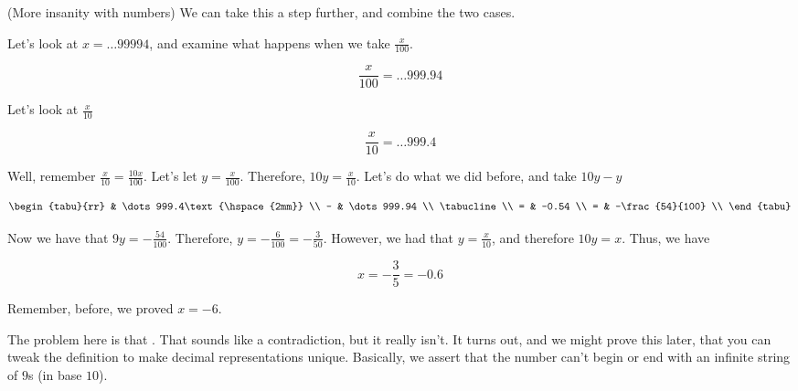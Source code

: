 \begin{example}(More insanity with numbers)
  We can take this a step further, and combine the two cases.

  Let's look at $x = \dots99994$, and examine what happens when we
  take $\frac{x}{100}$.

  \begin{displaymath}
    \frac{x}{100} = \dots999.94
  \end{displaymath}

  Let's look at $\frac{x}{10}$

  \begin{displaymath}
    \frac{x}{10} = \dots999.4
  \end{displaymath}

  Well, remember $\frac{x}{10} = \frac{10x}{100}$. Let's let
  $y = \frac{x}{100}$. Therefore, $10y = \frac{x}{10}$. Let's do what
  we did before, and take $10y - y$

  \begin{displaymath}
    \begin{tabu}{rr}
        & \dots999.4\text{\hspace{2mm}} \\
      - & \dots999.94 \\
      \tabucline \\
      = & -0.54 \\
      = & -\frac{54}{100} \\
    \end{tabu}
  \end{displaymath}

  Now we have that $9y = -\frac{54}{100}$. Therefore, $y =
  -\frac{6}{100} = -\frac{3}{50}$. However, we had that $y =
  \frac{x}{10}$, and therefore $10y = x$. Thus, we have

  \begin{displaymath}
    x = -\frac{3}{5} = -0.6
  \end{displaymath}

  Remember, before, we proved $x = -6$.
\end{example}

The problem here is that . That sounds like a contradiction, but it really isn't.
It turns out, and we might prove this later, that you can tweak the
definition to make decimal representations unique. Basically, we
assert that the number can't begin or end with an infinite string of
$9$s (in base $10$).

